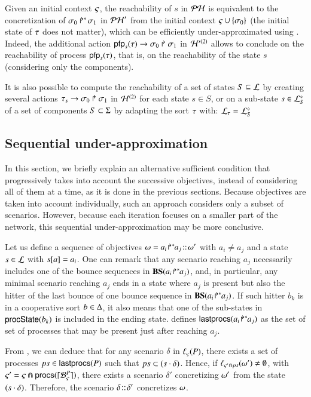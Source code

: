 Given an initial context $\ctx$, the reachability of $s$ in $\PH$ is equivalent to the concretization of $\PHobjp{\reach}{0}{1}$ in $\PH'$ from the initial context $\ctx \cup \{ \reach_0 \}$ (the initial state of $\total$ does not matter), which can be efficiently under-approximated using .
Indeed, the additional action $\PHhit{\pfp_s(\total)}{\reach_0}{\reach_1}$ in $\PHh'^{(2)}$ allows to conclude on the reachability of process $\pfp_s(\total)$, that is, on the reachability of the state $s$ (considering only the components).

It is also possible to compute the reachability of a set of states $S \subseteq \PHl$ by creating several actions $\PHhit{\total_s}{\reach_0}{\reach_1}$ in $\PHh^{(2)}$ for each state $s \in S$,
or on a sub-state $s \in \PHsubl[\PHl]_S$ of a set of components $S \subset \PHs$ by adapting the sort $\total$ with: $\PHl_\total = \PHsubl[\PHl]_S$


\subsection{Sequential under-approximation}

In this section, we briefly explain an alternative sufficient condition that
progressively takes into account the successive objectives, instead of
considering all of them at a time, as it is done in the previous sections.
Because objectives are taken into account individually, such an approach
considers only a subset of scenarios.
However, because each iteration focuses on a smaller part of the network, this
sequential under-approximation may be more conclusive.

Let us define a sequence of objectives $\w=\obj{a_i}{a_j}\concat\w'$ with
$a_i\neq a_j$ and a state $s\in \PHl$ with $\get{s}{a}=a_i$.
One can remark that any scenario reaching $a_j$ necessarily includes one of the
bounce sequences in $\BS(\obj{a_i}{a_j})$, and, in particular,
any minimal scenario reaching $a_j$ ends in a state where $a_j$ is present but
also the hitter of the last bounce of one bounce sequence in $\BS(\obj{a_i}{a_j})$.
If such hitter $b_k$ is in a cooperative sort $b\in\cs$, it also means that one of the sub-states
in $\csState(b_k)$ is included in the ending state.
 defines $\lastprocs(\obj{a_i}{a_j})$ as the set of set of
processes that may be present just after reaching $a_j$.

From , we can deduce that
for any scenario $\delta$ in $\uconcr(P)$,
there exists a set of processes $ps\in\lastprocs(P)$
such that $ps \subset (s\play\delta)$.
Hence, if $\muconcr_{\ctx'\Cap ps}(\w')\neq\emptyset$,
with $\ctx'=\ctx\Cap\procs(\mycwB{\ctx}{P})$,
there exists a scenario $\delta'$ concretizing $\w'$ from the
state $(s\play\delta)$.
Therefore, the scenario $\delta\concat\delta'$ concretizes
$\w$.

